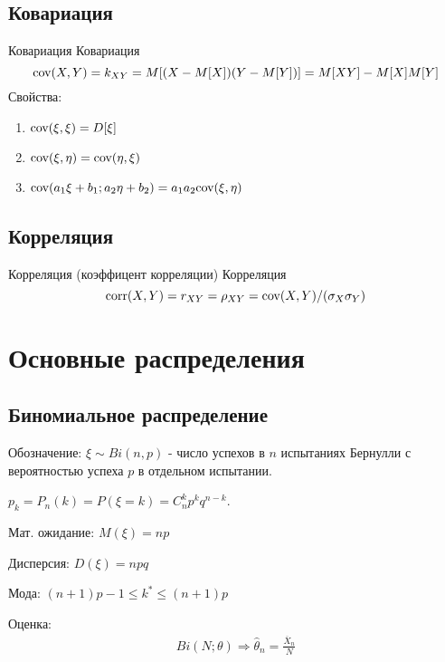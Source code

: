 \documentclass[12pt]{article}
\begin{document}
\subsection{Ковариация}
\begin{definition}
    {Ковариация}
    {Ковариация}
    \begin{displaymath}
        \textmd{cov}(X,Y)=k_{XY}=M[(X-M[X])(Y-M[Y])]=M[XY]-M[X]M[Y]
    \end{displaymath}
    Свойства:
    \begin{enumerate}
        \item $\textmd{cov}(\xi,\xi)=D[\xi]$
        \item $\textmd{cov}(\xi,\eta)=\textmd{cov}(\eta,\xi)$
        \item $\textmd{cov}(a_{1}\xi+b_{1};a_{2}\eta+b_{2})=a_{1}a_{2}\textmd{cov}(\xi,\eta)$
    \end{enumerate}
\end{definition}

\subsection{Корреляция}
\begin{definition}
    {Корреляция (коэффицент корреляции)}
    {Корреляция}
    \begin{displaymath}
        \textmd{corr}(X,Y)=r_{XY}=\rho_{XY}=\textmd{cov}(X,Y)/(\sigma_{X}\sigma_{Y})
    \end{displaymath}
\end{definition}

\newpage
\section{Основные распределения}
\subsection{Биномиальное распределение}
\par Обозначение: $\xi \sim Bi(n,p)$ - число успехов в $n$ испытаниях
Бернулли с вероятностью успеха $p$ в отдельном испытании.
\par $p_{k}=P_{n}(k)=P(\xi=k)=C_{n}^{k}p^{k}q^{n-k}$.
\par Мат. ожидание: $M(\xi)=np$
\par Дисперсия: $D(\xi)=npq$
\par Мода: $(n+1)p-1\leqslant k^{*}\leqslant(n+1)p$
\par Оценка:
\begin{eqnarray*}
    Bi(N;\theta) \Rightarrow \widehat{\theta}_{n}=\frac{\overline{X}_{n}}{N}
\end{eqnarray*}
\end{document}
